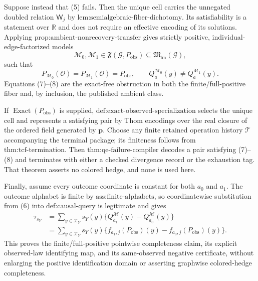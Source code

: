 Suppose instead that (5) fails.  Then the unique cell carries the unnegated doubled relation \(\mathsf W_j\) by \(\text{lem:semialgebraic-fiber-dichotomy}\).  Its satisfiability is a statement over \(\mathbb R\) and does not require an effective encoding of its solutions.  Applying \(\text{prop:ambient-nonrecovery-transfer}\) gives strictly positive, individual-edge-factorized models
\[
\mathcal M_0,\mathcal M_1
\in\mathfrak F(\mathcal G,P_{\mathrm{obs}})
\subseteq\mathfrak M_{\mathrm{lm}}(\mathcal G),
\tag{7}
\]
such that
\[
P_{\mathcal M_0}(\mathcal O)
=P_{\mathcal M_1}(\mathcal O)
=P_{\mathrm{obs}},
\qquad
Q_a^{\mathcal M_0}(y)\neq Q_a^{\mathcal M_1}(y).
\tag{8}
\]
Equations (7)--(8) are the exact-free obstruction in both the finite/full-positive fiber and, by inclusion, the published ambient class.

If \(\operatorname{Exact}(P_{\mathrm{obs}})\) is supplied, \(\text{def:exact-observed-specialization}\) selects the unique cell and represents a satisfying pair by Thom encodings over the real closure of the ordered field generated by \(\mathbf p\).  Choose any finite retained operation history \(\mathcal T\) accompanying the terminal package; its finiteness follows from \(\text{thm:tcf-termination}\).  Then \(\text{thm:qe-failure-compiler}\) decodes a pair satisfying (7)--(8) and terminates with either a checked divergence record or the exhaustion tag.  That theorem asserts no colored hedge, and none is used here.

Finally, assume every outcome coordinate is constant for both \(a_0\) and \(a_1\).  The outcome alphabet is finite by \(\text{ass:finite-alphabets}\), so coordinatewise substitution from (6) into \(\text{def:causal-query}\) is legitimate and gives
\[
\begin{aligned}
\tau_{s_Y}
&=\sum_{y\in\mathcal X_Y}s_Y(y)
\{Q_{a_1}^{\mathcal M}(y)-Q_{a_0}^{\mathcal M}(y)\}\\
&=\sum_{y\in\mathcal X_Y}s_Y(y)
\{f_{a_1,j}(P_{\mathrm{obs}})(y)-f_{a_0,j}(P_{\mathrm{obs}})(y)\}.
\end{aligned}
\tag{9}
\]
This proves the finite/full-positive pointwise completeness claim, its explicit observed-law identifying map, and its same-observed negative certificate, without enlarging the positive identification domain or asserting graphwise colored-hedge completeness.